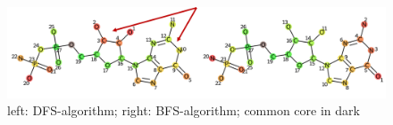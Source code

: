 \begin{figure}

\includegraphics[scale=0.5]{2ring_example2}\caption{left: DFS-algorithm; right: BFS-algorithm; common core in dark}

\end{figure}
